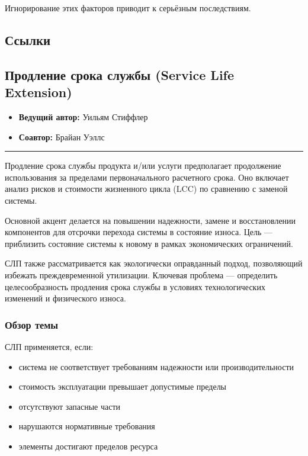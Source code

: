 \documentclass[14pt,a4paper]{extarticle}
\begin{document}
Игнорирование этих факторов приводит к серьёзным последствиям.

\subsection*{Ссылки}

\subsection{Продление срока службы (Service Life Extension)}

\begin{itemize}
\item \textbf{Ведущий автор:} Уильям Стиффлер
\item \textbf{Соавтор:} Брайан Уэллс
\end{itemize}

\hrule

Продление срока службы продукта и/или услуги предполагает продолжение использования за пределами первоначального расчетного срока. Оно включает анализ рисков и стоимости жизненного цикла (LCC) по сравнению с заменой системы.

Основной акцент делается на повышении надежности, замене и восстановлении компонентов для отсрочки перехода системы в состояние износа. Цель — приблизить состояние системы к новому в рамках экономических ограничений.

СЛП также рассматривается как экологически оправданный подход, позволяющий избежать преждевременной утилизации. Ключевая проблема — определить целесообразность продления срока службы в условиях технологических изменений и физического износа.

\subsubsection{Обзор темы}

СЛП применяется, если:

\begin{itemize}
\item система не соответствует требованиям надежности или производительности
\item стоимость эксплуатации превышает допустимые пределы
\item отсутствуют запасные части
\item нарушаются нормативные требования
\item элементы достигают пределов ресурса
\end{itemize}
\end{document}
